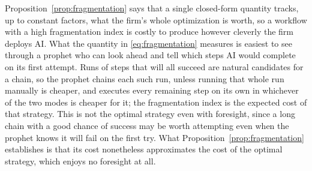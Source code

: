 Proposition~\ref{prop:fragmentation} says that a single closed-form quantity tracks, up to constant factors, what the firm's whole optimization is worth, so a workflow with a high fragmentation index is costly to produce however cleverly the firm deploys AI.
What the quantity in \eqref{eq:fragmentation} measures is easiest to see through a prophet who can look ahead and tell which steps AI would complete on its first attempt.
Runs of steps that will all succeed are natural candidates for a chain, so the prophet chains each such run, unless running that whole run manually is cheaper, and executes every remaining step on its own in whichever of the two modes is cheaper for it; the fragmentation index is the expected cost of that strategy.
This is not the optimal strategy even with foresight, since a long chain with a good chance of success may be worth attempting even when the prophet knows it will fail on the first try.
What Proposition~\ref{prop:fragmentation} establishes is that its cost nonetheless approximates the cost of the optimal strategy, which enjoys no foresight at all.

